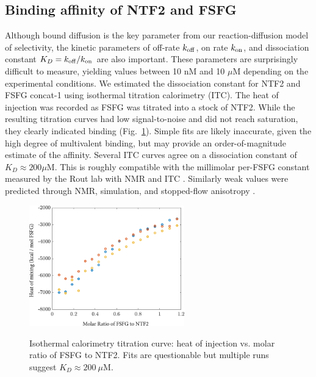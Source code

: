 \subsection{Binding affinity of NTF2 and FSFG}
Although bound diffusion is the key parameter from our reaction-diffusion model of selectivity, the kinetic parameters of off-rate $k_{\rm off}$, on rate $k_{\rm on}$, and dissociation constant $K_D = k_{\rm off}/k_{\rm on}$ are also important. These parameters are surprisingly difficult to measure, yielding values between 10 nM and 10 $\mu$M depending on the experimental conditions.  We estimated the dissociation constant for NTF2 and FSFG concat-1 using isothermal titration calorimetry (ITC).  The heat of injection was recorded as FSFG was titrated into a stock of NTF2.  While the resulting titration curves had low signal-to-noise and did not reach saturation, they clearly indicated binding (Fig.~\ref{fig:ITC-runs}).  Simple fits are likely inaccurate, given the high degree of multivalent binding, but may provide an order-of-magnitude estimate of the affinity.  Several ITC curves agree on a dissociation constant of $K_D \approx 200 \mu$M.  This is roughly compatible with the millimolar per-FSFG constant measured by the Rout lab with NMR and ITC \cite{hayama18}.  Similarly weak values were predicted through NMR, simulation, and stopped-flow anisotropy \cite{milles15}.

\begin{figure}
\caption{Isothermal calorimetry titration curve: heat of injection vs. molar ratio of FSFG to NTF2. Fits are questionable but multiple runs suggest $K_D \approx 200\ \mu$M.\\}
\centering
\includegraphics[width=0.6\textwidth]{figs/ch04/ITC_runs}
\label{fig:ITC-runs}
\end{figure} 

